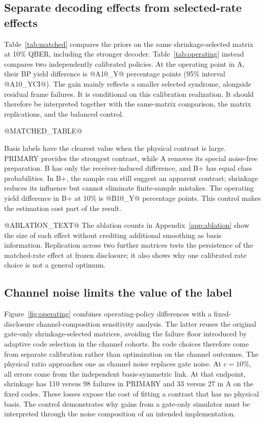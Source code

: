 \subsection{Separate decoding effects from selected-rate effects}
Table~\ref{tab:matched} compares the priors on the same shrinkage-selected matrix at 10\%
QBER, including the stronger decoder. Table~\ref{tab:operating} instead compares two
independently calibrated policies. At the operating point in A, their BP yield difference
is @A10_Y@ percentage points (95\% interval @A10_YCI@). The gain mainly reflects a smaller
selected syndrome, alongside residual frame failures. It is conditional on this calibration
realization. It should therefore be interpreted together with the same-matrix comparison,
the matrix replications, and the balanced control.

@MATCHED_TABLE@

Basis labels have the clearest value when the physical contrast is large. PRIMARY provides
the strongest contrast, while A removes its special noise-free preparation. B has only the
receiver-induced difference, and B+ has equal class probabilities. In B+, the sample can
still suggest an apparent contrast; shrinkage reduces its influence but cannot eliminate
finite-sample mistakes. The operating yield difference in B+ at 10\% is @B10_Y@ percentage
points. This control makes the estimation cost part of the result.

@ABLATION_TEXT@
The ablation counts in Appendix~\ref{app:ablation} show the size of each effect without
crediting additional smoothing as basis information. Replication across two further
matrices tests the persistence of the matched-rate effect at frozen disclosure; it also
shows why one calibrated rate choice is not a general optimum.

\subsection{Channel noise limits the value of the label}
Figure~\ref{fig:operating} combines operating-policy differences with a fixed-disclosure
channel-composition sensitivity analysis. The latter reuses the original gate-only
shrinkage-selected matrices, avoiding the failure floor introduced by adaptive code selection
in the channel cohorts. Its code choices therefore come from separate calibration rather
than optimization on the channel outcomes. The physical ratio approaches one as channel
noise replaces gate noise. At $c=10\%$, all errors come from the independent basis-symmetric link.
At that endpoint, shrinkage has 110 versus 98 failures in PRIMARY and 33 versus 27 in A
on the fixed codes. These losses expose the cost of fitting a contrast that has no
physical basis. The control demonstrates why gains from a gate-only simulator
must be interpreted through the noise composition of an intended implementation.

